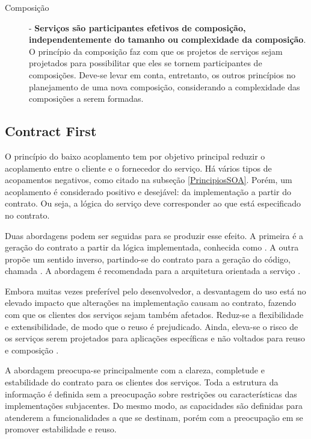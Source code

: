 \begin{description}
\item[Composição] - \textbf{Serviços são participantes efetivos de composição,
independentemente do tamanho ou complexidade da composição}. O princípio da
composição faz com que os projetos de serviços sejam projetados para
possibilitar que eles se tornem participantes de composições. Deve-se levar em
conta, entretanto, os outros princípios no planejamento de uma nova composição,
considerando a complexidade das composições a serem formadas.

\end{description}
 

\subsection{Contract First}
\vspace{-6mm}

O princípio do baixo acoplamento tem por objetivo principal reduzir o
acoplamento entre o cliente e o fornecedor do serviço. Há vários tipos de
acopamentos negativos, como citado na subseção \ref{PrincipiosSOA}. Porém, um
acoplamento é considerado positivo e desejável: da implementação a partir do contrato. Ou seja, a lógica
do serviço deve corresponder ao que está especificado no contrato.

Duas abordagens podem ser seguidas para se produzir esse efeito. A primeira é a
geração do contrato a partir da lógica implementada, conhecida como
\CdFirst{}. A outra propõe um sentido inverso, partindo-se do contrato
para a geração do código, chamada \CtFirst{}. A abordagem
\CtFirst{} é recomendada para a arquitetura orientada a serviço
\cite{erl2009web}.

Embora muitas vezes preferível pelo desenvolvedor, a desvantagem do uso
\CdFirst{} está no elevado impacto que alterações na implementação causam ao
contrato, fazendo com que os clientes dos serviços sejam também afetados.
Reduz-se a flexibilidade e extensibilidade, de modo que o reuso é prejudicado. Ainda,
eleva-se o risco de os serviços serem projetados para aplicações específicas e
não voltados para reuso e composição \cite{karthikeyancontract}.

A abordagem \CtFirst{} preocupa-se principalmente com a clareza, completude e
estabilidade do contrato para os clientes dos serviços. Toda a
estrutura da informação é definida sem a preocupação sobre restrições ou
características das implementações subjacentes. Do mesmo modo, as
capacidades são definidas para atenderem a funcionalidades a que se destinam,
porém com a preocupação em se promover estabilidade e reuso.

